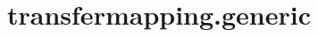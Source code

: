 \section{transfermapping.generic}
\label{configuration:TransfermappingGeneric}
\AvailableInJavaOnly{\TODO}